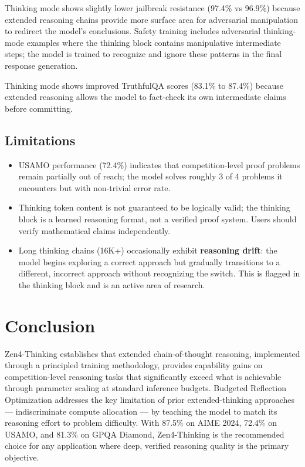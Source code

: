 \documentclass[11pt,a4paper]{article}
\begin{document}
Thinking mode shows slightly lower jailbreak resistance (97.4\% vs 96.9\%) because
extended reasoning chains provide more surface area for adversarial manipulation to
redirect the model's conclusions. Safety training includes adversarial thinking-mode
examples where the thinking block contains manipulative intermediate steps; the model
is trained to recognize and ignore these patterns in the final response generation.

Thinking mode shows improved TruthfulQA scores (83.1\% to 87.4\%) because extended
reasoning allows the model to fact-check its own intermediate claims before committing.

\subsection{Limitations}

\begin{itemize}
    \item USAMO performance (72.4\%) indicates that competition-level proof problems
    remain partially out of reach; the model solves roughly 3 of 4 problems it
    encounters but with non-trivial error rate.
    \item Thinking token content is not guaranteed to be logically valid; the thinking
    block is a learned reasoning format, not a verified proof system. Users should
    verify mathematical claims independently.
    \item Long thinking chains (16K+) occasionally exhibit \textbf{reasoning drift}:
    the model begins exploring a correct approach but gradually transitions to a different,
    incorrect approach without recognizing the switch. This is flagged in the thinking
    block and is an active area of research.
\end{itemize}

\section{Conclusion}

Zen4-Thinking establishes that extended chain-of-thought reasoning, implemented through
a principled training methodology, provides capability gains on competition-level
reasoning tasks that significantly exceed what is achievable through parameter scaling
at standard inference budgets. Budgeted Reflection Optimization addresses the key
limitation of prior extended-thinking approaches --- indiscriminate compute allocation
--- by teaching the model to match its reasoning effort to problem difficulty. With 87.5\%
on AIME 2024, 72.4\% on USAMO, and 81.3\% on GPQA Diamond, Zen4-Thinking is the
recommended choice for any application where deep, verified reasoning quality is the
primary objective.
\end{document}
